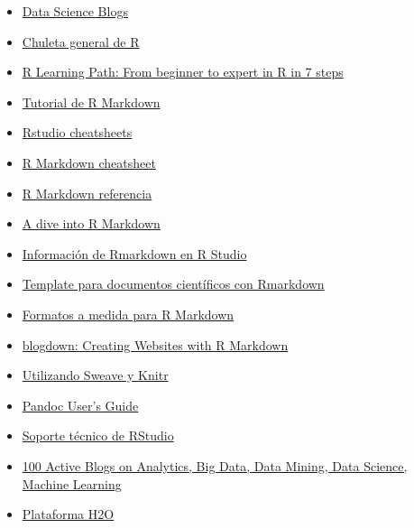 \documentclass[]{article}
\providecommand{\tightlist}{%
  \setlength{\itemsep}{0pt}\setlength{\parskip}{0pt}}
\begin{document}
\begin{itemize}
\tightlist
\item
  \href{https://github.com/rushter/data-science-blogs}{Data Science
  Blogs}
\item
  \href{https://cran.r-project.org/doc/contrib/Baggott-refcard-v2.pdf}{Chuleta
  general de R}
\item
  \href{http://www.kdnuggets.com/2016/03/datacamp-r-learning-path-7-steps.html}{R
  Learning Path: From beginner to expert in R in 7 steps}
\item
  \href{http://www.sfs.uni-tuebingen.de/~jvanrij/Tutorial/tutorialMarkdown.html}{Tutorial
  de R Markdown}
\item
  \href{https://www.rstudio.com/resources/cheatsheets/?utm_content=buffer1b56a\&utm_medium=social\&utm_source=twitter.com\&utm_campaign=buffer}{Rstudio
  cheatsheets}
\item
  \href{https://www.rstudio.com/wp-content/uploads/2015/02/rmarkdown-cheatsheet.pdf}{R
  Markdown cheatsheet}
\item
  \href{https://www.rstudio.com/wp-content/uploads/2015/03/rmarkdown-reference.pdf}{R
  Markdown referencia}
\item
  \href{http://cfss.uchicago.edu/program_rmarkdown.html}{A dive into R
  Markdown}
\item
  \href{http://rmarkdown.rstudio.com/}{Información de Rmarkdown en R
  Studio}
\item
  \href{http://www.petrkeil.com/?p=2401}{Template para documentos
  científicos con Rmarkdown}
\item
  \href{http://www.r-bloggers.com/r-markdown-custom-formats/}{Formatos a
  medida para R Markdown}
\item
  \href{https://bookdown.org/yihui/blogdown/}{blogdown: Creating
  Websites with R Markdown}
\item
  \href{https://support.rstudio.com/hc/en-us/articles/200552056-Using-Sweave-and-knitr}{Utilizando
  Sweave y Knitr}
\item
  \href{http://pandoc.org/MANUAL.html\#templates}{Pandoc User's Guide}
\item
  \href{https://support.rstudio.com/hc/en-us}{Soporte técnico de
  RStudio}
\item
  \href{http://www.kdnuggets.com/2016/03/100-active-blogs-analytics-big-data-science-machine-learning.html\#.VvqjkSV5Tio.linkedin}{100
  Active Blogs on Analytics, Big Data, Data Mining, Data Science,
  Machine Learning}
\item
  \href{https://github.com/h2oai}{Plataforma H2O}

\end{itemize}
\end{document}
